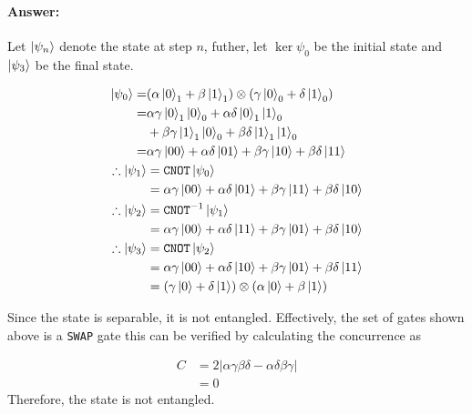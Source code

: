 \documentclass[reprint, amsmath,amssymb, aps]{revtex4-2}
\begin{document}
                \begin{mdframed}
                    \paragraph{Answer:}

                    Let $\ket{\psi_n}$ denote the state at step $n$, futher, let $\ker{\psi_0}$ be the initial state and $\ket{\psi_3}$ be the final state.

                    \begin{align*}
                        \ket{\psi_0} =& (\alpha\ket{0}_1 + \beta\ket{1}_1)\otimes(\gamma\ket{0}_0 + \delta\ket{1}_0) \\
                        =& \alpha\gamma\ket{0}_1\ket{0}_0 + \alpha\delta\ket{0}_1\ket{1}_0 \\
                        &+ \beta\gamma\ket{1}_1\ket{0}_0 + \beta\delta\ket{1}_1\ket{1}_0 \\
                        =& \alpha\gamma\ket{00} + \alpha\delta\ket{01} + \beta\gamma\ket{10} + \beta\delta\ket{11} \\
                        \therefore \ket{\psi_1} &= \texttt{CNOT}\ket{\psi_0} \\
                        &= \alpha\gamma\ket{00} + \alpha\delta\ket{01} + \beta\gamma\ket{11} + \beta\delta\ket{10} \\
                        \therefore \ket{\psi_2} &= \texttt{CNOT}^{-1}\ket{\psi_1} \\
                        &= \alpha\gamma\ket{00} + \alpha\delta\ket{11} + \beta\gamma\ket{01} + \beta\delta\ket{10} \\
                        \therefore \ket{\psi_3} &= \texttt{CNOT}\ket{\psi_2} \\
                        &= \alpha\gamma\ket{00} + \alpha\delta\ket{10} + \beta\gamma\ket{01} + \beta\delta\ket{11} \\
                        &= (\gamma\ket{0}+\delta\ket{1})\otimes(\alpha\ket{0}+\beta\ket{1})
                    \end{align*}

                    Since the state is separable, it is not entangled. Effectively, the set of gates shown above is a \texttt{SWAP} gate this can be verified by calculating the concurrence as

                    \begin{align*}
                        C &= 2|\alpha\gamma\beta\delta - \alpha\delta\beta\gamma| \\
                        &= 0
                    \end{align*}
                    Therefore, the state is not entangled.
                \end{mdframed}
\end{document}
